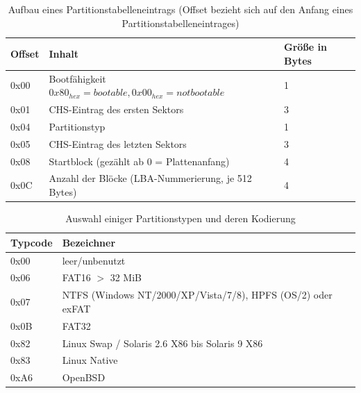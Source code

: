 \documentclass[11pt,a4paper]{article}
\begin{document}
\begin{table}[h]
	\begin{center}
		\begin{tabular}[c]{ | l | l | l | }
		\hline
		\cellcolor{grey} Offset & \cellcolor{grey} Inhalt & \cellcolor{grey} Größe in Bytes \\ \hline
		0x00 & Bootfähigkeit \(0x80_{hex}=bootable, 0x00_{hex}=not bootable\) & 1\\ \hline
		0x01 & CHS-Eintrag des ersten Sektors & 3 \\ \hline
		0x04 & Partitionstyp & 1 \\ \hline
		0x05 & CHS-Eintrag des letzten Sektors & 3 \\ \hline
		0x08 & Startblock (gezählt ab 0 = Plattenanfang) & 4 \\ \hline
		0x0C & Anzahl der Blöcke (LBA-Nummerierung, je 512 Bytes) & 4\\ \hline
		\end{tabular}
	\end{center}
	
	\caption{Aufbau eines Partitionstabelleneintrags (Offset bezieht sich auf den Anfang eines Partitionstabelleneintrages)}
	\label{tab:mbr_partentry_tbl}
\end{table}

\pagebreak{}

\begin{table}[h]
	\begin{center}
		\begin{tabular}[c]{ | l | l |}
		\hline
		\cellcolor{grey} Typcode & \cellcolor{grey} Bezeichner \\ \hline
		0x00 & leer/unbenutzt \\ \hline
		0x06 & FAT16 \(>\) 32 MiB \\ \hline
		0x07 & NTFS (Windows NT/2000/XP/Vista/7/8), HPFS (OS/2) oder exFAT \\ \hline
		0x0B & FAT32 \\ \hline
		0x82 & Linux Swap / Solaris 2.6 X86 bis Solaris 9 X86 \\ \hline
		0x83 & Linux Native \\ \hline
		0xA6 & OpenBSD \\ \hline
		\end{tabular}
	\end{center}
	
	\caption{Auswahl einiger Partitionstypen und deren Kodierung}
	\label{tab:mbr_parttype}
\end{table}
\end{document}
